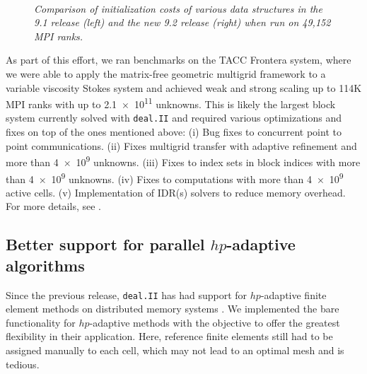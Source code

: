 \documentclass{ansarticle-preprint}
\newcommand{\specialword}[1]{\texttt{#1}}
\newcommand{\dealii}{{\specialword{deal.II}}\xspace}
\begin{document}
\begin{figure}
  \\
  \strut\hfill{}\hfill\strut
  \caption{\it Comparison of initialization costs of various data structures in the 9.1 release (left) and the new 9.2 release (right) when run on 49,152 MPI ranks.}
  \label{fig:init_costs}
\end{figure}


As part of this effort, we ran benchmarks on the TACC Frontera system, where we were
able to apply the matrix-free geometric multigrid framework to a variable viscosity
Stokes system and achieved weak and strong scaling up to 114K MPI ranks with up to
\num{2.1e11} unknowns. This is likely the largest block system currently solved with
\dealii{} and required various optimizations
and fixes on top of the ones mentioned above:
(i) Bug fixes to concurrent point to point communications.
(ii) Fixes multigrid transfer with adaptive refinement and more than \num{4e9} unknowns.
(iii) Fixes to index sets in block indices with more than \num{4e9} unknowns.
(iv) Fixes to computations with more than \num{4e9} active cells.
(v) Implementation of IDR(s) solvers to reduce memory overhead.
For more details, see \cite{clevenger_stokes19}.



\subsection{Better support for parallel $hp$-adaptive algorithms}
\label{subsec:hp}

Since the previous release, \dealii{} has had support for $hp$-adaptive finite element methods
on distributed memory systems \cite{dealII91}. We implemented the bare functionality
for $hp$-adaptive methods with the objective to offer the greatest flexibility in
their application. Here, reference finite elements still had to be assigned manually
to each cell, which may not lead to an optimal mesh and is tedious.
\end{document}
